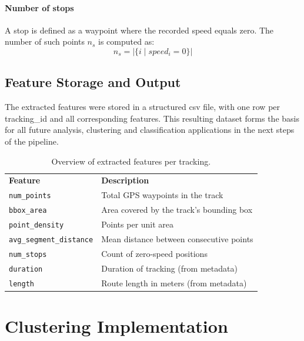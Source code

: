 \documentclass[a4paper,12pt,twoside]{scrreprt}
\begin{document}
\paragraph{Number of stops}

A stop is defined as a waypoint where the recorded speed equals zero. The
number of such points $n_s$ is computed as:
\[
  n_s = |\{i \mid speed_i = 0\}|
\]

\subsection{Feature Storage and Output}

The extracted features were stored in a structured csv file, with one row per
tracking\_id and all corresponding features. This resulting dataset forms the
basis for all future analysis, clustering and classification applications in
the next steps of the pipeline.

\begin{table}[h]
  \centering
  \begin{tabular}{ll}
    \textbf{Feature}                & \textbf{Description}
    \\
    \texttt{num\_points}            & Total GPS waypoints in the track
    \\
    \texttt{bbox\_area}             & Area covered by the track’s bounding box
    \\
    \texttt{point\_density}         & Points per unit area
    \\
    \texttt{avg\_segment\_distance} & Mean distance between consecutive
    points
    \\
    \texttt{num\_stops}             & Count of zero-speed positions
    \\
    \texttt{duration}               & Duration of tracking (from metadata)
    \\
    \texttt{length}                 & Route length in meters (from metadata)
    \\
  \end{tabular}
  \caption{Overview of extracted features per tracking.}
\end{table}

\section{Clustering Implementation}
\end{document}
